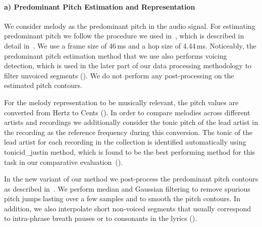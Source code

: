 \paragraph{a) Predominant Pitch Estimation and Representation} 

We consider melody as the predominant pitch in the audio signal. For estimating predominant pitch we follow the procedure we used in~, which is described in detail in~. We use a frame size of 46\,ms and a hop size of 4.44\,ms. Noticeably, the predominant pitch estimation method that we use also performs voicing detection, which is used in the later part of our data processing methodology to filter unvoiced segments (). We do not perform any post-processing on the estimated pitch contours.

For the melody representation to be musically relevant, the pitch values are converted from Hertz to Cents (). In order to compare melodies across different artists and recordings we additionally consider the tonic pitch of the lead artist in the recording as the reference frequency during this conversion. The tonic of the lead artist for each recording in the collection is identified automatically using \acrshort{tonicid_justin} method, which is found to be the best performing method for this task in our comparative evaluation~().

In the new variant of our method we post-process the predominant pitch contours as described in~. We perform median and Gaussian filtering to remove spurious pitch jumps lasting over a few samples and to smooth the pitch contours. In addition, we also interpolate short non-voiced segments that usually correspond to intra-phrase breath pauses or to consonants in the lyrics (). 



